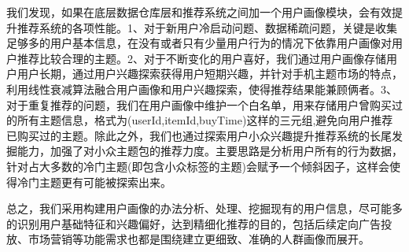 	我们发现，如果在底层数据仓库层和推荐系统之间加一个用户画像模块，会有效提升推荐系统的各项性能。1、对于新用户冷启动问题、数据稀疏问题，关键是收集足够多的用户基本信息，在没有或者只有少量用户行为的情况下依靠用户画像对用户推荐比较合理的主题。2、对于不断变化的用户喜好，我们通过用户画像存储用户用户长期，通过用户兴趣探索获得用户短期兴趣，并针对手机主题市场的特点，利用线性衰减算法融合用户画像和用户兴趣探索，使得推荐结果能兼顾俩者。3、对于重复推荐的问题，我们在用户画像中维护一个白名单，用来存储用户曾购买过的所有主题信息，格式为(userId,itemId,buyTime)这样的三元组,避免向用户推荐已购买过的主题。除此之外，我们也通过探索用户小众兴趣提升推荐系统的长尾发掘能力，加强了对小众主题包的推荐力度。主要思路是分析用户所有的行为数据，针对占大多数的冷门主题(即包含小众标签的主题)会赋予一个倾斜因子，这样会使得冷门主题更有可能被探索出来。

	总之，我们采用构建用户画像的办法分析、处理、挖掘现有的用户信息，尽可能多的识别用户基础特征和兴趣偏好，达到精细化推荐的目的，包括后续定向广告投放、市场营销等功能需求也都是围绕建立更细致、准确的人群画像而展开。
